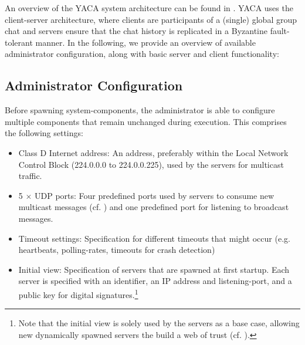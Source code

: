 \documentclass[runningheads]{llncs}
\begin{document}
An overview of the YACA system architecture can be found in . YACA uses the client-server architecture, where clients are participants of a (single) global group chat and servers ensure that the chat history is replicated in a Byzantine fault-tolerant manner. In the following, we provide an overview of available administrator configuration, along with basic server and client functionality:

\subsection{Administrator Configuration}\label{sec:admin_config}
Before spawning system-components, the administrator is able to configure multiple components that remain unchanged during execution. This comprises the following settings:
\begin{itemize}
    \item Class D Internet address: An address, preferably within the Local Network Control Block (224.0.0.0 to 224.0.0.225), used by the servers for multicast traffic.
    \item 5 $\times$ UDP ports: Four predefined ports used by servers to consume new multicast messages (cf. ) and one predefined port for listening to broadcast messages.
    \item Timeout settings: Specification for different timeouts that might occur (e.g. heartbeats, polling-rates, timeouts for crash detection)
    \item Initial view: Specification of servers that are spawned at first startup. Each server is specified with an identifier, an IP address and listening-port, and a public key for digital signatures.\footnote{Note that the initial view is solely used by the servers as a base case, allowing new dynamically spawned servers the build a web of trust (cf. ).}
\end{itemize}
\end{document}

